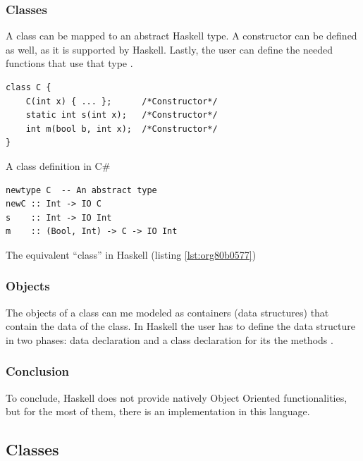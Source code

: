 \documentclass[a4paper, titlepage, twoside]{article}
\begin{document}
\subsubsection{Classes}
\label{sec:org6f0923e}

A class can be mapped to an abstract Haskell type. A constructor can be defined as well, as it is supported by Haskell. Lastly, the user can define the needed functions that use that type \autocite{frankObjectorientationHaskellExploring2013}.
\begin{listing}[htbp]
\begin{verbatim}
class C {
    C(int x) { ... };      /*Constructor*/
    static int s(int x);   /*Constructor*/
    int m(bool b, int x);  /*Constructor*/
}
\end{verbatim}
\caption{\label{lst:org80b0577}A class definition in C\#}
\end{listing}

\begin{listing}[htbp]
\begin{verbatim}
newtype C  -- An abstract type
newC :: Int -> IO C
s    :: Int -> IO Int
m    :: (Bool, Int) -> C -> IO Int
\end{verbatim}
\caption{The equivalent ``class'' in Haskell (listing \ref{lst:org80b0577})}
\end{listing}

\subsubsection{Objects}
\label{sec:org3c37368}

The objects of a class can me modeled as containers (data structures) that contain the data of the class. In Haskell the user has to define the data structure in two phases: data declaration and a class declaration for its the methods \autocite{frankObjectorientationHaskellExploring2013}.

\subsubsection{Conclusion}
\label{sec:org6405301}

To conclude, Haskell does not provide natively Object Oriented functionalities, but for the most of them, there is an implementation in this language.

\subsection{Classes}
\label{sec:org782020b}
\end{document}
